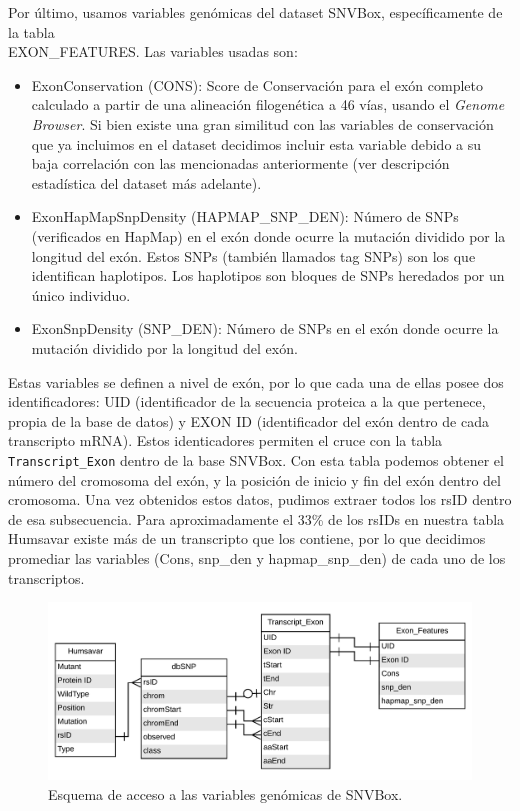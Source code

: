 Por último, usamos variables genómicas del dataset SNVBox, específicamente de la tabla \\ EXON\_FEATURES. Las variables usadas son:
\begin{itemize}
    \item ExonConservation (CONS): Score de Conservación para el exón completo calculado a partir de una alineación filogenética a 46 vías, usando el \textit{Genome Browser}. Si bien existe una gran similitud con las variables de conservación que ya incluimos en el dataset decidimos incluir esta variable debido a su baja correlación con las mencionadas anteriormente (ver descripción estadística del dataset más adelante).
    \item ExonHapMapSnpDensity (HAPMAP\_SNP\_DEN): Número de SNPs (verificados en HapMap) en el exón donde ocurre la mutación dividido por la longitud del exón. Estos SNPs (también llamados tag SNPs) son los que identifican haplotipos. Los haplotipos son bloques de SNPs heredados por un único individuo.
    \item ExonSnpDensity (SNP\_DEN): Número de SNPs en el exón donde ocurre la mutación dividido por la longitud del exón.
\end{itemize}

Estas variables se definen a nivel de exón, por lo que cada una de ellas posee dos identificadores: UID (identificador de la secuencia proteica a la que pertenece, propia de la base de datos) y EXON ID (identificador del exón dentro de cada transcripto mRNA). Estos identicadores permiten el cruce con la tabla \texttt{Transcript\_Exon} dentro de la base SNVBox. Con esta tabla podemos obtener el número del cromosoma del exón, y la posición de inicio y fin del exón dentro del cromosoma. Una vez obtenidos estos datos, pudimos extraer todos los rsID dentro de esa subsecuencia. Para aproximadamente el 33\% de los rsIDs en nuestra tabla Humsavar existe más de un transcripto que los contiene, por lo que decidimos promediar las variables (Cons, snp\_den y hapmap\_snp\_den) de cada uno de los transcriptos.

\begin{figure}[H]
\centering
    \includegraphics[scale=0.40]{documents/latex/figures/3/genomic/exon_diagram.pdf}
    \caption{Esquema de acceso a las variables genómicas de SNVBox.}
    \label{fig:exon_diagram}
\end{figure}

